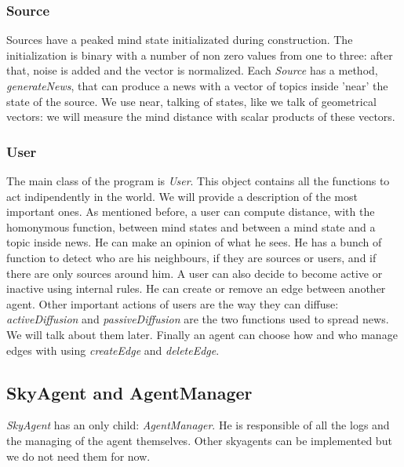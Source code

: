 \subsubsection{Source}
Sources have a peaked mind state initializated during construction.
The initialization is binary with a number of non zero values from one to three:
after that, noise is added and the vector is normalized.
Each \textit{Source} has a method, \textit{generateNews}, that can produce
a news with a vector of topics inside 'near' the state of the source.
We use near, talking of states, like we talk of geometrical vectors: we will
measure the mind distance with scalar products of these vectors.

\subsubsection{User}
The main class of the program is \textit{User}.
This object contains all the functions to act indipendently in the world.
We will provide a description of the most important ones.
As mentioned before, a user can compute distance, with the homonymous
function, between mind states and between a mind state and a
topic inside news. He can make an opinion of what he sees.
He has a bunch of function to detect who are his neighbours, if they
are sources or users, and if there are only sources around him.
A user can also decide to become active or inactive using internal rules.
He can create or remove an edge between another agent.
Other important actions of users are the way they can diffuse:
\textit{activeDiffusion} and \textit{passiveDiffusion} are the
two functions used to spread news. We will talk about them later.
Finally an agent can choose how and who manage edges with using
\textit{createEdge} and \textit{deleteEdge}.

\subsection{SkyAgent and AgentManager}
\textit{SkyAgent} has an only child: \textit{AgentManager}.
He is responsible of all the logs and the managing of the agent themselves.
Other skyagents can be implemented but we do not need them for now.

